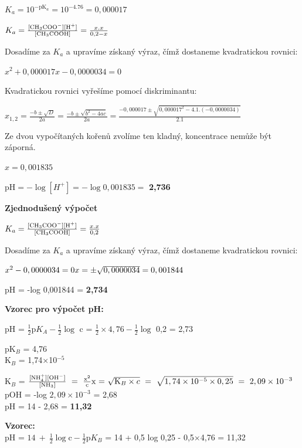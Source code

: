 

$K_a = 10^{-\textrm{pK}_a} = 10^{-4.76} = 0,000017$

$K_a = \frac{[\ce{CH3COO^-}][\ce{H^+}]}{[\ce{CH3COOH}]} = \frac{x.x}{0,2-x}$

Dosadíme za $K_a$ a upravíme získaný výraz, čímž dostaneme kvadratickou rovnici:

$x^2 + 0,000017x - 0,0000034 = 0$

Kvadratickou rovnici vyřešíme pomocí diskriminantu:

$x_{1,2} = \frac{-b \pm \sqrt{D}}{2a} = \frac{-b \pm \sqrt{b^2 - 4ac}}{2a} = \frac{-0,000017 \pm \sqrt{0,000017^2 - 4.1.(-0,0000034)}}{2.1}$

Ze dvou vypočítaných kořenů zvolíme ten kladný, koncentrace nemůže být záporná.

$x = 0,001835$

$\textrm{pH} = -\log[H^+] = -\log0,001835 =$ \textbf{2,736}

\textbf{Zjednodušený výpočet}

$K_a = \frac{[\ce{CH3COO^-}][\ce{H^+}]}{[\ce{CH3COOH}]} = \frac{x.x}{0,2}$

Dosadíme za $K_a$ a upravíme získaný výraz, čímž dostaneme kvadratickou rovnici:

$x^2 - 0,0000034 = 0\\
x = \pm\sqrt{0,0000034} = 0,001844$

pH = -log 0,001844 = \textbf{2,734}

\textbf{Vzorec pro výpočet pH:}

pH = $\frac{1}{2}\textrm{p}K_A-\frac{1}{2}\log$ c = $\frac{1}{2}\times4,76 -\frac{1}{2}\log$ 0,2 = 2,73



pK$_B$ = 4,76\\
K$_B$ = 1,74$\times$10$^{-5}$

K$_B$ = $\frac{[\ce{NH$^+_4$}][\ce{OH-}]}{[\ce{NH3}]}\ =\ \frac{\ce{x^2}}{\ce{c}}\\
\textrm{x = }\sqrt{\textrm{K}_B\times c}\ =\ \sqrt{1,74\times10^{-5}\times 0,25}\ =\ 2,09\times10^{-3}$\\
pOH = -log $2,09\times10^{-3}$ = 2,68\\
pH = 14 - 2,68 = \textbf{11,32}

\textbf{Vzorec:}\\
pH = $14\ +\ \frac{1}{2}\log\textrm{c} - \frac{1}{2}\textrm{p}K_B$ = 14 + 0,5 log 0,25 - 0,5$\times$4,76 = 11,32

